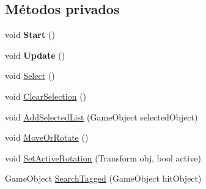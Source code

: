 \subsection*{Métodos privados}
\begin{DoxyCompactItemize}
\item 
\mbox{\label{class_selection_control_a3561fe9fd9a6a8d2c6e4a2f389b6d2dd}} 
void {\bfseries Start} ()
\item 
\mbox{\label{class_selection_control_ad79a2cfc74608733edcd1be0164cc491}} 
void {\bfseries Update} ()
\item 
void \mbox{\hyperlink{class_selection_control_a6e08e34b6c7bfe54260faeaa29b369c0}{Select}} ()
\item 
void \mbox{\hyperlink{class_selection_control_a41c82620db4b415375d6579c5a0aa17b}{Clear\+Selection}} ()
\item 
void \mbox{\hyperlink{class_selection_control_ae0e2d8a1673fab1de51bee6e15d3f872}{Add\+Selected\+List}} (Game\+Object selected\+Object)
\item 
void \mbox{\hyperlink{class_selection_control_a9684b6a02a6e31a00c6a87b5e9d29f62}{Move\+Or\+Rotate}} ()
\item 
void \mbox{\hyperlink{class_selection_control_a124591d0f0eac9b99cd9a7cc4f9839c7}{Set\+Active\+Rotation}} (Transform obj, bool active)
\item 
Game\+Object \mbox{\hyperlink{class_selection_control_af43fca6b87eee0f60bc8bb79f987d42c}{Search\+Tagged}} (Game\+Object hit\+Object)
\end{DoxyCompactItemize}
